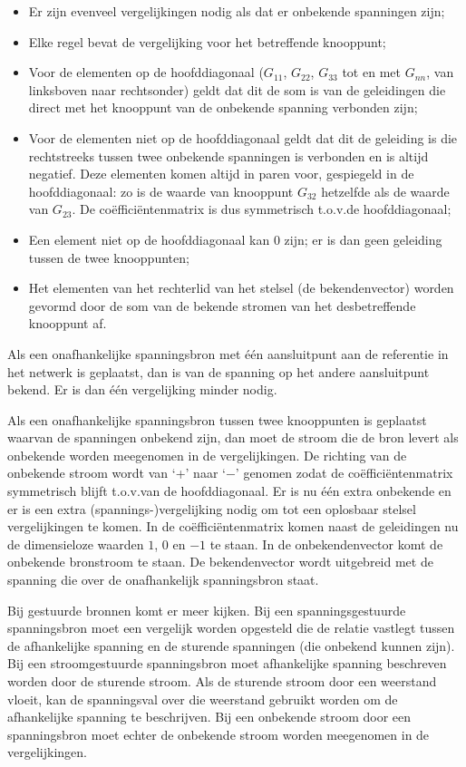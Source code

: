 \begin{itemize}
\item Er zijn evenveel vergelijkingen nodig als dat er onbekende spanningen zijn;
\item Elke regel bevat de vergelijking voor het betreffende knooppunt;
\item Voor de elementen op de hoofddiagonaal ($G_{11}$, $G_{22}$, $G_{33}$ tot en met $G_{nn}$, van linksboven naar rechtsonder) geldt dat dit de som is van de geleidingen die direct met het knooppunt van de onbekende spanning verbonden zijn;
\item Voor de elementen niet op de hoofddiagonaal geldt dat dit de geleiding is die rechtstreeks tussen twee onbekende spanningen is verbonden en is altijd negatief. Deze elementen komen altijd in paren voor, gespiegeld in de hoofddiagonaal: zo is de waarde van knooppunt $G_{32}$ hetzelfde als de waarde van $G_{23}$. De coëfficiëntenmatrix is dus symmetrisch t.o.v.\@ de hoofddiagonaal;
\item Een element niet op de hoofddiagonaal kan 0 zijn; er is dan geen geleiding tussen de twee knooppunten;
\item Het elementen van het rechterlid van het stelsel (de bekendenvector) worden gevormd door de som van de bekende stromen van het desbetreffende knooppunt af.
\end{itemize}

Als een onafhankelijke spanningsbron met één aansluitpunt aan de referentie in het netwerk is geplaatst, dan is van de spanning op het andere aansluitpunt bekend. Er is dan één vergelijking minder nodig.

Als een onafhankelijke spanningsbron tussen twee knooppunten is geplaatst waarvan de spanningen onbekend zijn, dan moet de stroom die de bron levert als onbekende worden meegenomen in de vergelijkingen. De richting van de onbekende stroom wordt van `+' naar `$-$' genomen zodat de coëfficiëntenmatrix symmetrisch blijft t.o.v.\@ van de hoofddiagonaal. Er is nu één extra onbekende en er is een extra (spannings-)vergelijking nodig om tot een oplosbaar stelsel vergelijkingen te komen. In de coëfficiëntenmatrix komen naast de geleidingen nu de dimensieloze waarden $1$, $0$ en $-1$ te staan. In de onbekendenvector komt de onbekende bronstroom te staan. De bekendenvector wordt uitgebreid met de spanning die over de onafhankelijk spanningsbron staat.

Bij gestuurde bronnen komt er meer kijken. Bij een spanningsgestuurde spanningsbron moet een vergelijk worden opgesteld die de relatie vastlegt tussen de afhankelijke spanning en de sturende spanningen (die onbekend kunnen zijn). Bij een stroomgestuurde spanningsbron moet afhankelijke spanning beschreven worden door de sturende stroom. Als de sturende stroom door een weerstand vloeit, kan de spanningsval over die weerstand gebruikt worden om de afhankelijke spanning te beschrijven. Bij een onbekende stroom door een spanningsbron moet echter de onbekende stroom worden meegenomen in de vergelijkingen.

